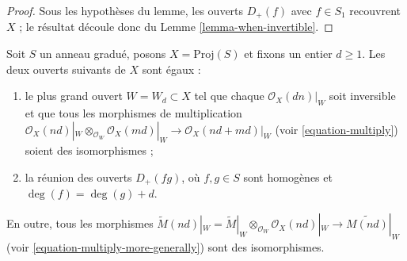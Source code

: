 \begin{proof}
Sous les hypothèses du lemme, les ouverts $D_{+}(f)$ avec $f \in S_1$
recouvrent $X$ ; le résultat découle donc du
Lemme \ref{lemma-when-invertible}.
\end{proof}

\begin{lemma}
\label{lemma-where-invertible}
Soit $S$ un anneau gradué, posons $X = \text{Proj}(S)$ et fixons un entier
$d \geq 1$. Les deux ouverts suivants de $X$ sont égaux :
\begin{enumerate}
\item le plus grand ouvert $W = W_d \subset X$ tel que chaque
$\mathcal{O}_X(dn)|_W$ soit inversible et que tous les morphismes de
multiplication
$\mathcal{O}_X(nd)|_W \otimes_{\mathcal{O}_W} \mathcal{O}_X(md)|_W
\to \mathcal{O}_X(nd + md)|_W$
(voir \ref{equation-multiply}) soient des isomorphismes ;
\item la réunion des ouverts $D_{+}(fg)$, où $f, g \in S$ sont homogènes et
$\deg(f) = \deg(g) + d$.
\end{enumerate}
En outre, tous les morphismes
$\widetilde M(nd)|_W = \widetilde M|_W \otimes_{\mathcal{O}_W}
\mathcal{O}_X(nd)|_W \to \widetilde{M(nd)}|_W$
(voir \ref{equation-multiply-more-generally}) sont des isomorphismes.
\end{lemma}

